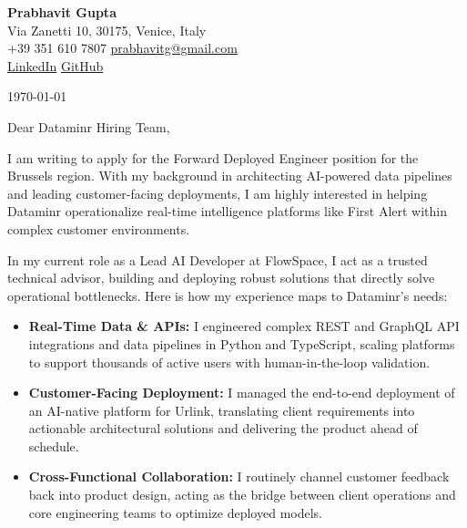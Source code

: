 \documentclass[11pt,a4paper]{article}
\begin{document}
\begin{center}
    {\huge \textbf{Prabhavit Gupta}} \\
    \vspace{4pt}
    Via Zanetti 10, 30175, Venice, Italy \\
    +39 351 610 7807 \textbar{} \href{mailto:prabhavitg@gmail.com}{prabhavitg@gmail.com} \\
    \href{https://www.linkedin.com/in/prabhavit/}{LinkedIn} \textbar{} \href{https://github.com/prab-gupta}{GitHub}
\end{center}

\vspace{20pt}

\noindent \today

\vspace{10pt}

\noindent Dear Dataminr Hiring Team,

\vspace{10pt}

\noindent I am writing to apply for the Forward Deployed Engineer position for the Brussels region. With my background in architecting AI-powered data pipelines and leading customer-facing deployments, I am highly interested in helping Dataminr operationalize real-time intelligence platforms like First Alert within complex customer environments.

\vspace{10pt}

\noindent In my current role as a Lead AI Developer at FlowSpace, I act as a trusted technical advisor, building and deploying robust solutions that directly solve operational bottlenecks. Here is how my experience maps to Dataminr's needs:

\begin{itemize}[leftmargin=*]
    \item \textbf{Real-Time Data \& APIs:} I engineered complex REST and GraphQL API integrations and data pipelines in Python and TypeScript, scaling platforms to support thousands of active users with human-in-the-loop validation.
    \item \textbf{Customer-Facing Deployment:} I managed the end-to-end deployment of an AI-native platform for Urlink, translating client requirements into actionable architectural solutions and delivering the product ahead of schedule.
    \item \textbf{Cross-Functional Collaboration:} I routinely channel customer feedback back into product design, acting as the bridge between client operations and core engineering teams to optimize deployed models.
\end{itemize}
\end{document}
